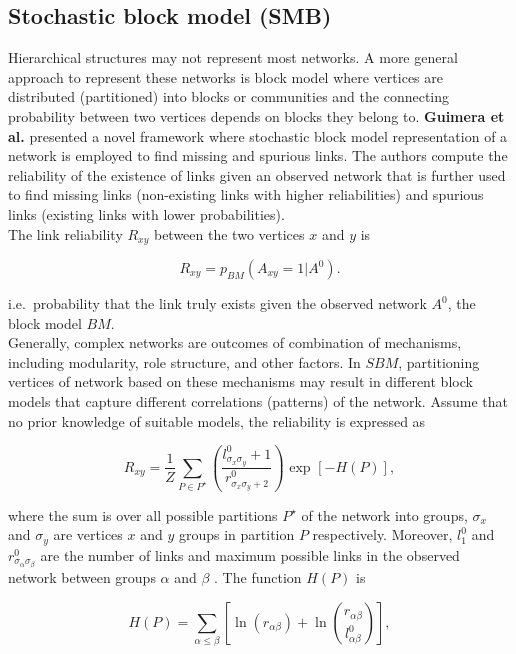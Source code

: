 \subsection{Stochastic block model (SMB)}

Hierarchical structures may not represent most networks. A more general
approach to represent these networks is block model where vertices are
distributed (partitioned) into blocks or communities and the connecting
probability between two vertices depends on blocks they belong to.
\textbf{Guimera et al.} presented a novel framework where stochastic
block model representation of a network is employed to find missing and
spurious links. The authors compute the reliability of the existence of
links given an observed network that is further used to find missing
links (non-existing links with higher reliabilities) and spurious links
(existing links with lower probabilities).\\

The link reliability \(R_{xy}\) between the two vertices \(x\) and \(y\)
is

\[R_{xy} = p_{BM} (A_{xy} = 1 | A^0).\]

i.e.~probability that the link truly exists given the observed network
\(A^0\), the block model \(BM\).\\

Generally, complex networks are outcomes of combination of mechanisms,
including modularity, role structure, and other factors. In \(SBM\),
partitioning vertices of network based on these mechanisms may result in
different block models that capture different correlations (patterns) of
the network. Assume that no prior knowledge of suitable models, the
reliability is expressed as

\[
    R_{xy} = \frac{1}{Z} \sum_{P \in P^{\star}} \left( \frac{l^{0}_{\sigma_x \sigma_y} + 1}{r^{0}_{\sigma_x \sigma_y + 2}} \right) \text{ exp } \left[ -H(P) \right],
\]

where the sum is over all possible partitions \(P^{\star}\) of the
network into groups, \(\sigma_x\) and \(\sigma_y\) are vertices \(x\)
and \(y\) groups in partition \(P\) respectively. Moreover, \(l^0_1\)
and \(r^0_{\sigma_{\alpha} \sigma_{\beta}}\) are the number of links and
maximum possible links in the observed network between groups \(\alpha\)
and \(\beta\) . The function \(H(P)\) is

\[H(P) = \sum_{\alpha \leq \beta} \left[ \ln \left( r_{\alpha \beta} \right) + \ln \binom {r_{\alpha \beta}}{l^0_{\alpha \beta}} \right],\]

